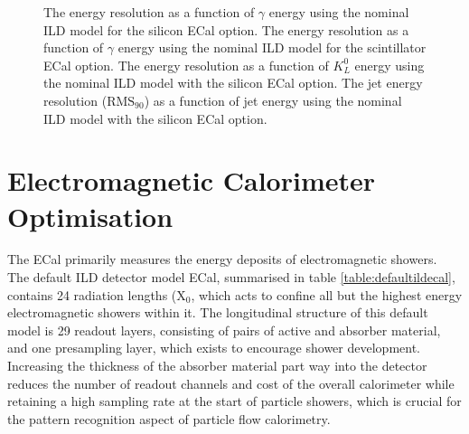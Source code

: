 \begin{figure}
\caption[\protect{} The energy resolution as a function of $\gamma$ energy using the nominal ILD model for the silicon ECal option.  \protect{} The energy resolution as a function of $\gamma$ energy using the nominal ILD model for the scintillator ECal option.  \protect{} The energy resolution as a function of $K^{0}_{L}$ energy using the nominal ILD model with the silicon ECal option.  \protect{} The jet energy resolution ($\text{RMS}_{90}$) as a function of jet energy using the nominal ILD model with the silicon ECal option.]{\protect{} The energy resolution as a function of $\gamma$ energy using the nominal ILD model for the silicon ECal option.  \protect{} The energy resolution as a function of $\gamma$ energy using the nominal ILD model for the scintillator ECal option.  \protect{} The energy resolution as a function of $K^{0}_{L}$ energy using the nominal ILD model with the silicon ECal option.  \protect{} The jet energy resolution ($\text{RMS}_{90}$) as a function of jet energy using the nominal ILD model with the silicon ECal option.}
\label{fig:nominalres}
\end{figure}




\section{Electromagnetic Calorimeter Optimisation}
\label{sec:ecal}
The ECal primarily measures the energy deposits of electromagnetic showers.  The default ILD detector model ECal, summarised in table \ref{table:defaultildecal}, contains 24 radiation lengths ($\text{X}_{0}$, which acts to confine all but the highest energy electromagnetic showers within it.  The longitudinal structure of this default model is 29 readout layers, consisting of pairs of active and absorber material, and one presampling layer, which exists to encourage shower development.  Increasing the thickness of the absorber material part way into the detector reduces the number of readout channels and cost of the overall calorimeter while retaining a high sampling rate at the start of particle showers, which is crucial for the pattern recognition aspect of particle flow calorimetry.  


